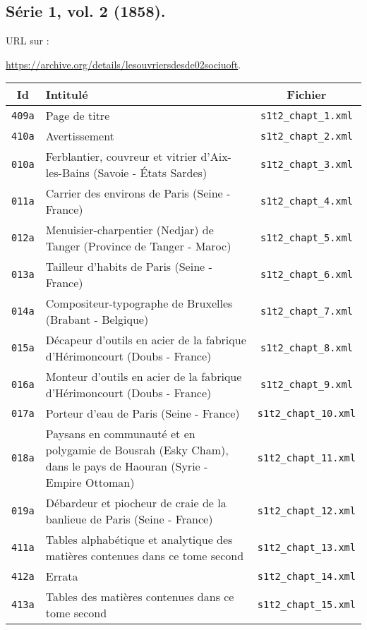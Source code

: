 \subsection{Série 1, vol. 2 (1858).}
\label{mappings1t2}

URL sur \ia{} : 

\url{https://archive.org/details/lesouvriersdesde02sociuoft}.

\begin{center}
\begin{longtable}{ | c | p{9.5cm} | c | }
\hline
Id & Intitulé & Fichier \\ \hline
\texttt{409a} & Page de titre & \texttt{s1t2\_chapt\_1.xml} \\ \hline
\texttt{410a} & Avertissement & \texttt{s1t2\_chapt\_2.xml} \\ \hline
\texttt{010a} & Ferblantier, couvreur et vitrier d'Aix-les-Bains (Savoie - États Sardes) & \texttt{s1t2\_chapt\_3.xml} \\ \hline
\texttt{011a} & Carrier des environs de Paris (Seine - France) & \texttt{s1t2\_chapt\_4.xml} \\ \hline
\texttt{012a} & Menuisier-charpentier (Nedjar) de Tanger (Province de Tanger - Maroc) & \texttt{s1t2\_chapt\_5.xml} \\ \hline
\texttt{013a} & Tailleur d'habits de Paris (Seine - France) & \texttt{s1t2\_chapt\_6.xml} \\ \hline
\texttt{014a} & Compositeur-typographe de Bruxelles (Brabant - Belgique) & \texttt{s1t2\_chapt\_7.xml} \\ \hline
\texttt{015a} & Décapeur d'outils en acier de la fabrique d'Hérimoncourt (Doubs - France) & \texttt{s1t2\_chapt\_8.xml} \\ \hline
\texttt{016a} & Monteur d'outils en acier de la fabrique d'Hérimoncourt (Doubs - France) & \texttt{s1t2\_chapt\_9.xml} \\ \hline
\texttt{017a} & Porteur d'eau de Paris (Seine - France) & \texttt{s1t2\_chapt\_10.xml} \\ \hline
\texttt{018a} & Paysans en communauté et en polygamie de Bousrah (Esky Cham), dans le pays de Haouran (Syrie - Empire Ottoman) & \texttt{s1t2\_chapt\_11.xml} \\ \hline
\texttt{019a} & Débardeur et piocheur de craie de la banlieue de Paris (Seine - France) & \texttt{s1t2\_chapt\_12.xml} \\ \hline
\texttt{411a} & Tables alphabétique et analytique des matières contenues dans ce tome second & \texttt{s1t2\_chapt\_13.xml} \\ \hline
\texttt{412a} & Errata & \texttt{s1t2\_chapt\_14.xml} \\ \hline
\texttt{413a} & Tables des matières contenues dans ce tome second & \texttt{s1t2\_chapt\_15.xml} \\ \hline
\end{longtable}
\end{center}

